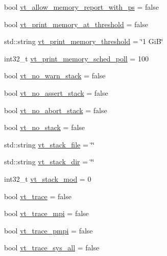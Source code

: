 \begin{DoxyCompactItemize}
\item 
bool \hyperlink{structvt_1_1arguments_1_1_app_config_a40e8cdecd312fab611e262b12324d1bd}{vt\+\_\+allow\+\_\+memory\+\_\+report\+\_\+with\+\_\+ps} = false
\item 
bool \hyperlink{structvt_1_1arguments_1_1_app_config_a7f53d72ccd7261b0e959fdc8d86df3a3}{vt\+\_\+print\+\_\+memory\+\_\+at\+\_\+threshold} = false
\item 
std\+::string \hyperlink{structvt_1_1arguments_1_1_app_config_a3f564c6296069d6cf478a3f43ba9e8a4}{vt\+\_\+print\+\_\+memory\+\_\+threshold} = \char`\"{}1 GiB\char`\"{}
\item 
int32\+\_\+t \hyperlink{structvt_1_1arguments_1_1_app_config_af139aee07bf04d392501a4ee19478e31}{vt\+\_\+print\+\_\+memory\+\_\+sched\+\_\+poll} = 100
\item 
bool \hyperlink{structvt_1_1arguments_1_1_app_config_a745524c2e7ac750835940972cdebf3c3}{vt\+\_\+no\+\_\+warn\+\_\+stack} = false
\item 
bool \hyperlink{structvt_1_1arguments_1_1_app_config_af5a38d00691ff72e08847ab5091f6345}{vt\+\_\+no\+\_\+assert\+\_\+stack} = false
\item 
bool \hyperlink{structvt_1_1arguments_1_1_app_config_a47012ebf82f55c03e8659e1df32ebe58}{vt\+\_\+no\+\_\+abort\+\_\+stack} = false
\item 
bool \hyperlink{structvt_1_1arguments_1_1_app_config_a9738d4749047b9a796d7db8a20e29182}{vt\+\_\+no\+\_\+stack} = false
\item 
std\+::string \hyperlink{structvt_1_1arguments_1_1_app_config_a8230bcba38ca9003f8cd507886572743}{vt\+\_\+stack\+\_\+file} = \char`\"{}\char`\"{}
\item 
std\+::string \hyperlink{structvt_1_1arguments_1_1_app_config_a364ee3b9e5ed25590d1c4dea55731e6c}{vt\+\_\+stack\+\_\+dir} = \char`\"{}\char`\"{}
\item 
int32\+\_\+t \hyperlink{structvt_1_1arguments_1_1_app_config_aa93f6ff7f613f402638deab33cc28adb}{vt\+\_\+stack\+\_\+mod} = 0
\item 
bool \hyperlink{structvt_1_1arguments_1_1_app_config_a863d6b2a20ba63ac85f4de2bd8cbe75c}{vt\+\_\+trace} = false
\item 
bool \hyperlink{structvt_1_1arguments_1_1_app_config_a76934e4c1a8c3b9b1eedaf87977330ec}{vt\+\_\+trace\+\_\+mpi} = false
\item 
bool \hyperlink{structvt_1_1arguments_1_1_app_config_a68a2d29db4c6ebd4ca3cc0141cf151d4}{vt\+\_\+trace\+\_\+pmpi} = false
\item 
bool \hyperlink{structvt_1_1arguments_1_1_app_config_a97d8aa275d3c1368d347bb9e88e1abe0}{vt\+\_\+trace\+\_\+sys\+\_\+all} = false

\end{DoxyCompactItemize}
